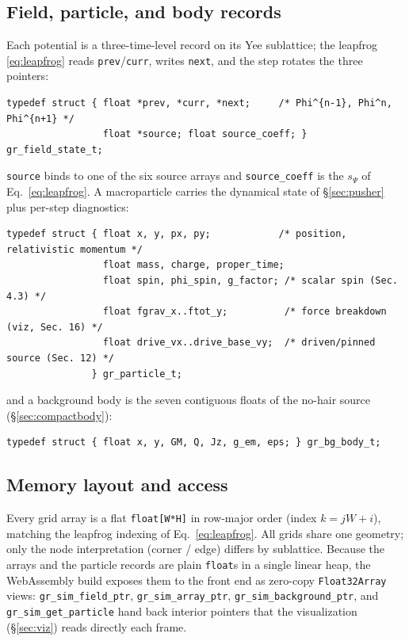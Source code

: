 \documentclass[11pt]{article}
\begin{document}
\subsection{Field, particle, and body records}

Each potential is a three-time-level record on its Yee sublattice; the leapfrog
\eqref{eq:leapfrog} reads \texttt{prev}/\texttt{curr}, writes \texttt{next}, and
the step rotates the three pointers:
\begin{verbatim}
typedef struct { float *prev, *curr, *next;     /* Phi^{n-1}, Phi^n, Phi^{n+1} */
                 float *source; float source_coeff; } gr_field_state_t;
\end{verbatim}
\texttt{source} binds to one of the six source arrays and \texttt{source\_coeff}
is the $s_\Psi$ of Eq.~\eqref{eq:leapfrog}. A macroparticle carries the dynamical
state of \S\ref{sec:pusher} plus per-step diagnostics:
\begin{verbatim}
typedef struct { float x, y, px, py;            /* position, relativistic momentum */
                 float mass, charge, proper_time;
                 float spin, phi_spin, g_factor; /* scalar spin (Sec. 4.3) */
                 float fgrav_x..ftot_y;          /* force breakdown (viz, Sec. 16) */
                 float drive_vx..drive_base_vy;  /* driven/pinned source (Sec. 12) */
               } gr_particle_t;
\end{verbatim}
and a background body is the seven contiguous floats of the no-hair source
(\S\ref{sec:compactbody}):
\begin{verbatim}
typedef struct { float x, y, GM, Q, Jz, g_em, eps; } gr_bg_body_t;
\end{verbatim}

\subsection{Memory layout and access}

Every grid array is a flat \texttt{float[W*H]} in row-major order (index
$k=jW+i$), matching the leapfrog indexing of Eq.~\eqref{eq:leapfrog}. All grids
share one geometry; only the node interpretation (corner / edge) differs by
sublattice. Because the arrays and the particle records are plain
\texttt{float}s in a single linear heap, the WebAssembly build exposes them to
the front end as zero-copy \texttt{Float32Array} views: \texttt{gr\_sim\_field\_ptr},
\texttt{gr\_sim\_array\_ptr}, \texttt{gr\_sim\_background\_ptr}, and
\texttt{gr\_sim\_get\_particle} hand back interior pointers that the visualization
(\S\ref{sec:viz}) reads directly each frame.
\end{document}

